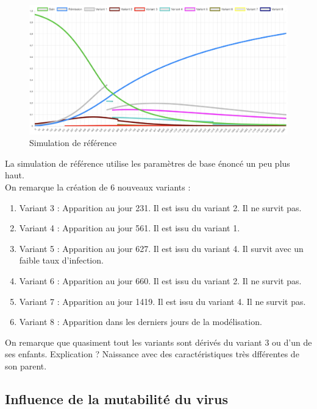 \documentclass{article}
\begin{document}
\begin{figure}[h]
    \includegraphics[width=\linewidth]{images/Simulation1.png}
    \caption{Simulation de référence}
    \label{fig:simulation1}
\end{figure}

\noindent
La simulation de référence utilise les paramètres de base énoncé un peu plus haut. \\
On remarque la création de 6 nouveaux variants : \\
\begin{enumerate}
    \item Variant 3 : Apparition au jour 231. Il est issu du variant 2. Il ne survit pas.
    \item Variant 4 : Apparition au jour 561. Il est issu du variant 1.
    \item Variant 5 : Apparition au jour 627. Il est issu du variant 4. Il survit avec un faible taux d'infection.
    \item Variant 6 : Apparition au jour 660. Il est issu du variant 2. Il ne survit pas.
    \item Variant 7 : Apparition au jour 1419. Il est issu du variant 4. Il ne survit pas.
    \item Variant 8 : Apparition dans les derniers jours de la modélisation.
\end{enumerate}

On remarque que quasiment tout les variants sont dérivés du variant 3 ou d'un de ses enfants. Explication ? Naissance avec des caractéristiques très dfférentes de son parent. \\

\subsection{Influence de la mutabilité du virus}
\end{document}

